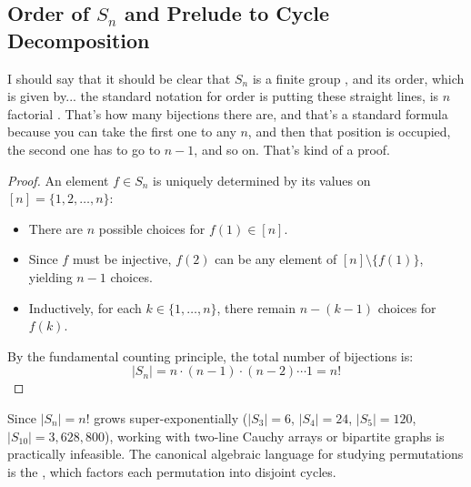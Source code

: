 \subsection{Order of \texorpdfstring{$S_n$}{S\_n} and Prelude to Cycle Decomposition}

\begin{speech}[01:05:31 - 01:06:07]
I should say that it should be clear that $S_n$ is a finite group , and its order, which is given by... the standard notation for order is putting these straight lines, is $n$ factorial . That's how many bijections there are, and that's a standard formula because you can take the first one to any $n$, and then that position is occupied, the second one has to go to $n-1$, and so on. That's kind of a proof.
\end{speech}

\begin{content}

\begin{proof}
An element $f \in S_n$ is uniquely determined by its values on $[n] = \{1, 2, \dots, n\}$:
\begin{itemize}
    \item There are $n$ possible choices for $f(1) \in [n]$.
    \item Since $f$ must be injective, $f(2)$ can be any element of $[n] \setminus \{f(1)\}$, yielding $n-1$ choices.
    \item Inductively, for each $k \in \{1, \dots, n\}$, there remain $n - (k - 1)$ choices for $f(k)$.
\end{itemize}
By the fundamental counting principle, the total number of bijections is:
\[
|S_n| = n \cdot (n-1) \cdot (n-2) \cdots 1 = n!
\]
\end{proof}

\begin{steps}
Since $|S_n| = n!$ grows super-exponentially ($|S_3| = 6$, $|S_4| = 24$, $|S_5| = 120$, $|S_{10}| = 3{,}628{,}800$), working with two-line Cauchy arrays or bipartite graphs is practically infeasible. The canonical algebraic language for studying permutations is the , which factors each permutation into disjoint cycles.
\end{steps}
\end{content}

